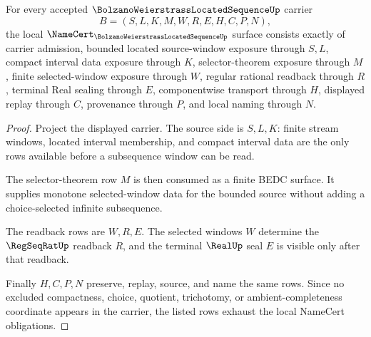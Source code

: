\begin{theorem}
\label{thm:bolzano-weierstrass-located-sequence-namecert-obligations}
For every accepted $\BolzanoWeierstrassLocatedSequenceUp$ carrier
$$
B=(S,L,K,M,W,R,E,H,C,P,N),
$$
the local $\NameCert_{\BolzanoWeierstrassLocatedSequenceUp}$ surface consists exactly of carrier admission, bounded located source-window exposure through $S,L$, compact interval data exposure through $K$, selector-theorem exposure through $M$, finite selected-window exposure through $W$, regular rational readback through $R$, terminal Real sealing through $E$, componentwise transport through $H$, displayed replay through $C$, provenance through $P$, and local naming through $N$.
\end{theorem}
\begin{proof}
Project the displayed carrier. The source side is $S,L,K$: finite stream windows, located interval membership, and compact interval data are the only rows available before a subsequence window can be read.

The selector-theorem row $M$ is then consumed as a finite BEDC surface. It supplies monotone selected-window data for the bounded source without adding a choice-selected infinite subsequence.

The readback rows are $W,R,E$. The selected windows $W$ determine the $\RegSeqRatUp$ readback $R$, and the terminal $\RealUp$ seal $E$ is visible only after that readback.

Finally $H,C,P,N$ preserve, replay, source, and name the same rows. Since no excluded compactness, choice, quotient, trichotomy, or ambient-completeness coordinate appears in the carrier, the listed rows exhaust the local NameCert obligations.
\end{proof}

